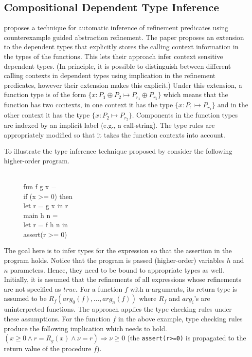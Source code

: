 \newcommand{\ctx}{\oplus}
\subsection{Compositional Dependent Type Inference}

\cite{sujag:VMCAI13} proposes a technique for automatic inference of refinement predicates 
using counterexample guided abstraction refinement. 
The paper proposes an extension to the dependent types that
explicitly stores the calling context information in the types of the functions.
This lets their approach infer context sensitive dependent types.
(In principle, it is possible to distinguish between different calling contexts in dependent types 
using implication in the refinement predicates, however their extension makes this explicit.)
Under this extension, a function type is of the form $\{ x:P_1 \ctx P_2 \mapsto P_{r_1} \ctx P_{r_2}\}$ 
which means that the function has two contexts, in one context it has the type $\{x:P_1 \mapsto  P_{r_1} \}$ 
and in the other context it has the type $\{x:P_2 \mapsto  P_{r_2} \}$. Components in the function types
are indexed by an implicit label (e.g., a call-string).
The type rules are appropriately modified so that it takes the function contexts into account.

To illustrate the type inference technique proposed by \cite{sujag:VMCAI12} consider the following
higher-order program.
%
\begin{figure}
\begin{myprogram}
\\
\pnl \> fun f g x = \\
\pnl \>  \> if (x >= 0) then \\
\pnl \>  \> \>  let r = g x in r \\
\pnl \> main h n =  \\
\pnl \> \> let r = f h n in \\
\pnl \> \> assert(r >= 0)
\end{myprogram}
\end{figure}
%
The goal here is to infer types for the expression so that the assertion in the program holds.
Notice that the program is passed (higher-order) variables $h$ and $n$ parameters. Hence, they
need to be bound to appropriate types as well. 
Initially, it is assumed that the refinements of all expressions whose refinements are not specified as $true$.
For a function $f$ with n-arguments, its return type is assumed to be $R_f(arg_0(f),\ldots,arg_n(f))$ where 
$R_f$ and $arg_i$'s are uninterpreted functions.
The approach applies the type checking rules under these assumptions.
For the function $f$ in the above example, 
type checking rules produce the following implication which needs to hold.
$(x \ge 0 \wedge r = R_g(x) \wedge \nu = r) \Rightarrow \nu \ge 0$
(the \texttt{assert(r>=0)} is propagated to the return value of the procedure $f$).

